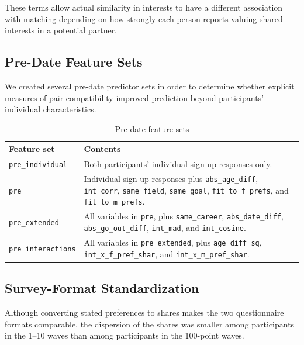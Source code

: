 \documentclass[11pt,letterpaper,reqno]{amsart}
\numberwithin{equation}{subsection}
\theoremstyle{definition}
\numberwithin{thm}{subsection}
\begin{document}
These terms allow actual similarity in interests to have a different association with matching depending on how strongly each person reports valuing shared interests in a potential partner.

\subsection{Pre-Date Feature Sets}

We created several pre-date predictor sets in order to determine whether explicit measures of pair compatibility improved prediction beyond participants' individual characteristics.

\begin{table}[htbp]
\centering
\caption{Pre-date feature sets}
\begin{tabular}{p{} p{}}
\toprule
\textbf{Feature set} & \textbf{Contents} \\
\midrule
\texttt{pre\_individual}
&
Both participants' individual sign-up responses only. \\[0.5em]

\texttt{pre}
&
Individual sign-up responses plus
\texttt{abs\_age\_diff},
\texttt{int\_corr},
\texttt{same\_field},
\texttt{same\_goal},
\texttt{fit\_to\_f\_prefs}, and
\texttt{fit\_to\_m\_prefs}. \\[0.5em]

\texttt{pre\_extended}
&
All variables in \texttt{pre}, plus
\texttt{same\_career},
\texttt{abs\_date\_diff},
\texttt{abs\_go\_out\_diff},
\texttt{int\_mad}, and
\texttt{int\_cosine}. \\[0.5em]

\texttt{pre\_interactions}
&
All variables in \texttt{pre\_extended}, plus
\texttt{age\_diff\_sq},
\texttt{int\_x\_f\_pref\_shar}, and
\texttt{int\_x\_m\_pref\_shar}. \\
\bottomrule
\end{tabular}
\end{table}

\subsection{Survey-Format Standardization}

Although converting stated preferences to shares makes the two questionnaire formats comparable, the dispersion of the shares was smaller among participants in the 1--10 waves than among participants in the 100-point waves.
\end{document}
